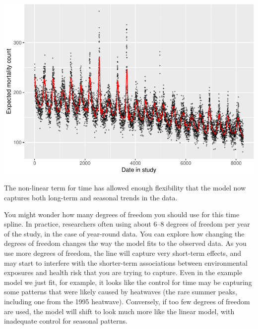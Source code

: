 \documentclass[
]{book}
\newenvironment{Shaded}{\begin{snugshade}}{\end{snugshade}}
\newcommand{\AttributeTok}[1]{\textcolor[rgb]{0.77,0.63,0.00}{#1}}
\newcommand{\FloatTok}[1]{\textcolor[rgb]{0.00,0.00,0.81}{#1}}
\newcommand{\FunctionTok}[1]{\textcolor[rgb]{0.00,0.00,0.00}{#1}}
\newcommand{\NormalTok}[1]{#1}
\newcommand{\SpecialCharTok}[1]{\textcolor[rgb]{0.00,0.00,0.00}{#1}}
\newcommand{\StringTok}[1]{\textcolor[rgb]{0.31,0.60,0.02}{#1}}
\begin{document}
\begin{Shaded}
\end{Shaded}

\includegraphics{adv_epi_analysis_files/figure-latex/unnamed-chunk-52-1.pdf}

The non-linear term for time has allowed enough flexibility that the model now
captures both long-term and seasonal trends in the data.

You might wonder how many degrees of freedom you should use for this time spline. In practice,
researchers often using about 6--8 degrees of freedom per year of the study, in
the case of year-round data. You can explore how changing the degrees of freedom
changes the way the model fits to the observed data. As you use more degrees of
freedom, the line will capture very short-term effects, and may start to
interfere with the shorter-term associations between environmental exposures and
health risk that you are trying to capture. Even in the example model we just
fit, for example, it looks like the control for time may be capturing some
patterns that were likely caused by heatwaves (the rare summer peaks, including
one from the 1995 heatwave). Conversely, if too few degrees of freedom are used,
the model will shift to look much more like the linear model, with inadequate
control for seasonal patterns.
\end{document}
